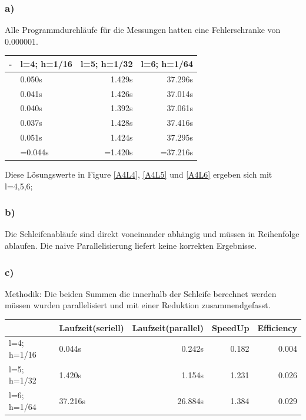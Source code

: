\documentclass{report}
\begin{document}
	\subsubsection{a)}
Alle Programmdurchläufe für die Messungen hatten eine Fehlerschranke von 0.000001.\newline
\begin{tabular}{|l|l|r|r|}
		\hline
		- & l=4; h=1/16 & l=5; h=1/32 & l=6; h=1/64\\
		\hline
		& 0.050s & 1.429s & 37.296s \\
		& 0.041s & 1.426s & 37.014s  \\
		& 0.040s & 1.392s & 37.061s \\
		& 0.037s & 1.428s & 37.416s  \\
		& 0.051s & 1.424s & 37.295s  \\
		& =0.044s & =1.420s & =37.216s  \\
		\hline

	\end{tabular}
	\newline Diese Lösungswerte in Figure \ref{A4L4}, \ref{A4L5} und \ref{A4L6} ergeben sich mit l=4,5,6;  \newline
	
	\subsubsection{b)}
	Die Schleifenabläufe sind direkt voneinander abhängig und müssen in Reihenfolge ablaufen. Die naive Parallelisierung liefert keine korrekten Ergebnisse. 
	

	\subsubsection{c)}
		Methodik: Die beiden Summen die innerhalb der Schleife berechnet werden müssen wurden parallelisiert und mit einer Reduktion zusammendgefasst.\newline
		\begin{tabular}{|l|l|r|r|r|}
				\hline
				&Laufzeit(seriell) &Laufzeit(parallel) & SpeedUp & Efficiency\\
			\hline
			l=4; h=1/16 & 0.044s & 0.242s & 0.182 & 0.004 \\
			l=5; h=1/32 & 1.420s & 1.154s & 1.231 & 0.026 \\
				l=6; h=1/64 & 37.216s & 26.884s & 1.384 & 0.029 \\
				\hline

		\end{tabular}
\end{document}
